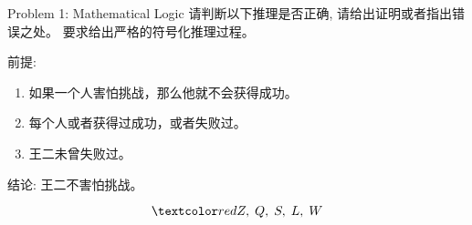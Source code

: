 
\begin{frame}{}
  \begin{exampleblock}{Problem 1: Mathematical Logic}	
    请判断以下推理是否正确, 请给出证明或者指出错误之处。
    要求给出严格的符号化推理过程。
    
    前提:
    \begin{enumerate}[(1)]
      \item 如果一个人害怕挑战，那么他就不会获得成功。
      \item 每个人或者获得过成功，或者失败过。
      \item 王二未曾失败过。
    \end{enumerate}

    结论: 王二不害怕挑战。
  \end{exampleblock}

  \pause
  \vspace{0.30cm}
  \[
    \red{Z,\; Q,\; S,\; L,\; W}
  \]
\end{frame}

% 

% 
% 
% 

% 
